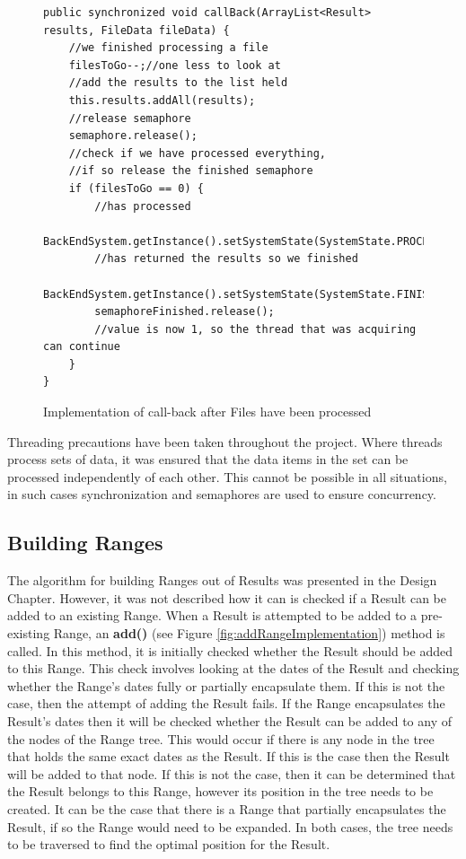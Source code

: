 \begin{figure}[H]
\begin{lstlisting}
public synchronized void callBack(ArrayList<Result> results, FileData fileData) {
    //we finished processing a file
    filesToGo--;//one less to look at
    //add the results to the list held
    this.results.addAll(results);
    //release semaphore
    semaphore.release();
    //check if we have processed everything, 
    //if so release the finished semaphore
    if (filesToGo == 0) {
        //has processed
        BackEndSystem.getInstance().setSystemState(SystemState.PROCESSED);
        //has returned the results so we finished
        BackEndSystem.getInstance().setSystemState(SystemState.FINISHED);
        semaphoreFinished.release();
	    //value is now 1, so the thread that was acquiring can continue
    }
}
\end{lstlisting}
\caption{Implementation of call-back after Files have been processed}
\label{fig:callbackFilesImplemented}
\end{figure}

\par Threading precautions have been taken throughout the project. Where threads process sets of data, it was ensured that the data items in the set can be processed independently of each other. This cannot be possible in all situations, in such cases synchronization and semaphores are used to ensure concurrency.

\subsection{Building Ranges}
\par The algorithm for building Ranges out of Results was presented in the Design Chapter. However, it was not described how it can is checked if a Result can be added to an existing Range. When a Result is attempted to be added to a pre-existing Range, an \textbf{add()} (see Figure \ref{fig:addRangeImplementation}) method is called. In this method, it is initially checked whether the Result should be added to this Range. This check involves looking at the dates of the Result and checking whether the Range's dates fully or partially encapsulate them. If this is not the case, then the attempt of adding the Result fails. If the Range encapsulates the Result's dates then it will be checked whether the Result can be added to any of the nodes of the Range tree. This would occur if there is any node in the tree that holds the same exact dates as the Result. If this is the case then the Result will be added to that node. If this is not the case, then it can be determined that the Result belongs to this Range, however its position in the tree needs to be created. It can be the case that there is a Range that partially encapsulates the Result, if so the Range would need to be expanded. In both cases, the tree needs to be traversed to find the optimal position for the Result.

